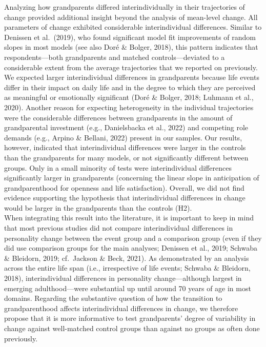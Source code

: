 \documentclass[
  english,
  man,floatsintext]{apa7}
\begin{document}
Analyzing how grandparents differed interindividually in their trajectories of change provided additional insight beyond the analysis of mean-level change. All parameters of change exhibited considerable interindividual differences. Similar to Denissen et al.~(2019), who found significant model fit improvements of random slopes in most models (see also Doré \& Bolger, 2018), this pattern indicates that respondents---both grandparents and matched controls---deviated to a considerable extent from the average trajectories that we reported on previously.\\
We expected larger interindividual differences in grandparents because life events differ in their impact on daily life and in the degree to which they are perceived as meaningful or emotionally significant (Doré \& Bolger, 2018; Luhmann et al., 2020). Another reason for expecting heterogeneity in the individual trajectories were the considerable differences between grandparents in the amount of grandparental investment (e.g., Danielsbacka et al., 2022) and competing role demands (e.g., Arpino \& Bellani, 2022) present in our samples. Our results, however, indicated that interindividual differences were larger in the controls than the grandparents for many models, or not significantly different between groups. Only in a small minority of tests were interindividual differences significantly larger in grandparents (concerning the linear slope in anticipation of grandparenthood for openness and life satisfaction). Overall, we did not find evidence supporting the hypothesis that interindividual differences in change would be larger in the grandparents than the controls (H2).\\
When integrating this result into the literature, it is important to keep in mind that most previous studies did not compare interindividual differences in personality change between the event group and a comparison group (even if they did use comparison groups for the main analyses; Denissen et al., 2019; Schwaba \& Bleidorn, 2019; cf.~Jackson \& Beck, 2021). As demonstrated by an analysis across the entire life span (i.e., irrespective of life events; Schwaba \& Bleidorn, 2018), interindividual differences in personality change---although largest in emerging adulthood---were substantial up until around 70 years of age in most domains. Regarding the substantive question of how the transition to grandparenthood affects interindividual differences in change, we therefore propose that it is more informative to test grandparents' degree of variability in change against well-matched control groups than against no groups as often done previously.\\
\end{document}
